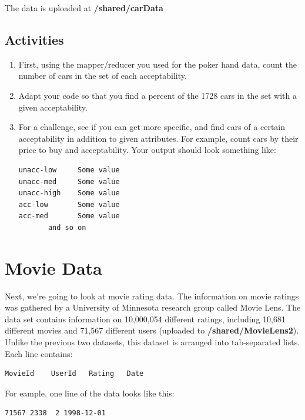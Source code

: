 \documentclass[letterpaper,10pt,openany,oneside]{sphinxmanual}
\begin{document}
The data is uploaded at \textbf{/shared/carData}


\subsection{Activities}
\label{WmrActivities/WmrActivities:id1}\begin{enumerate}
\item {} 
First, using the mapper/reducer you used for the poker hand
data, count the number of cars in the set of each acceptability.

\item {} 
Adapt your code so that you find a percent of the 1728 cars in
the set with a given acceptability.

\item {} 
For a challenge, see if you can get more specific, and find cars
of a certain acceptability in addition to given attributes. For
example, count cars by their price to buy and acceptability. Your
output should look something like:

\begin{Verbatim}[commandchars=\\\{\}]
unacc-low     Some value
unacc-med     Some value
unacc-high    Some value
acc-low       Some value
acc-med       Some value
       and so on
\end{Verbatim}

\end{enumerate}


\section{Movie Data}
\label{WmrActivities/WmrActivities:movie-data}
Next, we're going to look at movie rating data. The information on
movie ratings was gathered by a University of Minnesota research
group called Movie Lens. The data set contains information on
10,000,054 different ratings, including 10,681 different movies and
71,567 different users (uploaded to \textbf{/shared/MovieLens2}). Unlike the previous two datasets, this
dataset is arranged into tab-separated lists. Each line contains:

\begin{Verbatim}[commandchars=\\\{\}]
MovieId    UserId   Rating   Date
\end{Verbatim}

For eample, one line of the data looks like this:

\begin{Verbatim}[commandchars=\\\{\}]
71567 2338  2 1998-12-01
\end{Verbatim}
\end{document}

